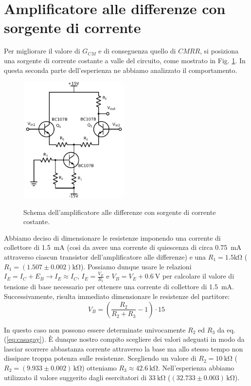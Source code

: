 \section{Amplificatore alle differenze con sorgente di corrente}

Per migliorare il valore di $G_{CM}$ e di conseguenza quello di $CMRR$, si posiziona una sorgente di corrente costante a valle del circuito, come mostrato in Fig. \ref{fig:cc2}.
In questa seconda parte dell'esperienza ne abbiamo analizzato il comportamento.

\begin{figure}
	\caption{Schema dell'amplificatore alle differenze con sorgente di corrente costante.}
	\includegraphics[width=55mm]{cc2.pdf}
	\label{fig:cc2}
\end{figure}

Abbiamo deciso di dimensionare le resistenze imponendo una corrente di collettore di \SI{1.5}{\milli\ampere} (così da avere una corrente di quiescenza di circa \SI{0.75}{\milli\ampere} attraverso ciascun transistor dell'amplificatore alle differenze) e una $R_1=1.5\si{\kilo\ohm}$ ( $R_1=(1.507 \pm 0.002)\si{\kilo\ohm}$). Possiamo dunque usare le relazioni $I_E=I_C+E_B \rightarrow I_E \approx I_C$, $I_E=\frac{V_E}{R_1}$ e $V_B=V_E+\SI{0.6}{\volt}$ per calcolare il valore di tensione di base necessario per ottenere una corrente di collettore di \SI{1.5}{\milli\ampere}. Successivamente, risulta immediato dimensionare le resistenze del partitore: 
\begin{equation}
V_B=(\frac{R_2}{R_2+R_3}-1) \cdot 15
\label{eq:casagay}
\end{equation}


In questo caso non possono essere determinate univocamente $R_2$ ed $R_3$ da eq. (\ref{eq:casagay}). È dunque nostro compito scegliere dei valori adeguati in modo da lasciar scorrere abbastanza corrente attraverso la base ma allo stesso tempo non dissipare troppa potenza sulle resistenze. Scegliendo un valore di $R_2=\SI{10}{\kilo\ohm}$ ($R_2=(9.933\pm0.002)\,\si{\kilo\ohm}$) otteniamo $R_3 \approx \SI{42.6}{\kilo\ohm}$. Nell'esperienza abbiamo utilizzato il valore suggerito dagli esercitatori di $\SI{33}{\kilo\ohm}$ ($(32.733 \pm 0.003)\,\si{\kilo\ohm}$). %

